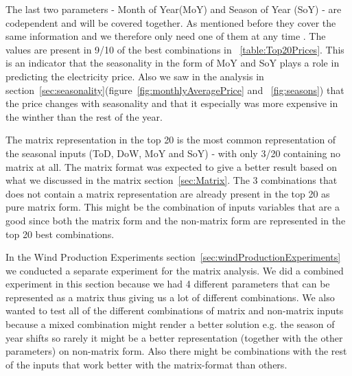 The last two parameters - Month of Year(MoY) and Season of Year (SoY) - are codependent and will be covered together. As mentioned before they cover the same information and we therefore only need one of them at any time . The values are present in 9/10 of the best combinations in ~\ref{table:Top20Prices}. This is an indicator that the seasonality in the form of MoY and SoY plays a role in predicting the electricity price. Also we saw in the analysis in section~\ref{sec:seasonality}(figure~\ref{fig:monthlyAveragePrice} and ~\ref{fig:seasons}) that the price changes with seasonality and that it especially was more expensive in the winther than the rest of the year.

The matrix representation in the top 20 is the most common representation of the seasonal inputs (ToD, DoW, MoY and SoY) - with only 3/20 containing no matrix at all. The matrix format was expected to give a better result based on what we discussed in the matrix section~\ref{sec:Matrix}. The 3 combinations that does not contain a matrix representation are already present in the top 20 as pure matrix form. This might be the combination of inputs variables that are a good since both the matrix form and the non-matrix form are represented in the top 20 best combinations.

In the Wind Production Experiments section~\ref{sec:windProductionExperiments} we conducted a separate experiment for the matrix analysis. We did a combined experiment in this section because we had 4 different parameters that can be represented as a matrix thus giving us a lot of different combinations. We also wanted to test all of the different combinations of matrix and non-matrix inputs because a mixed combination might render a better solution e.g. the season of year shifts so rarely it might be a better representation (together with the other parameters) on non-matrix form. Also there might be combinations with the rest of the inputs that work better with the matrix-format than others.


